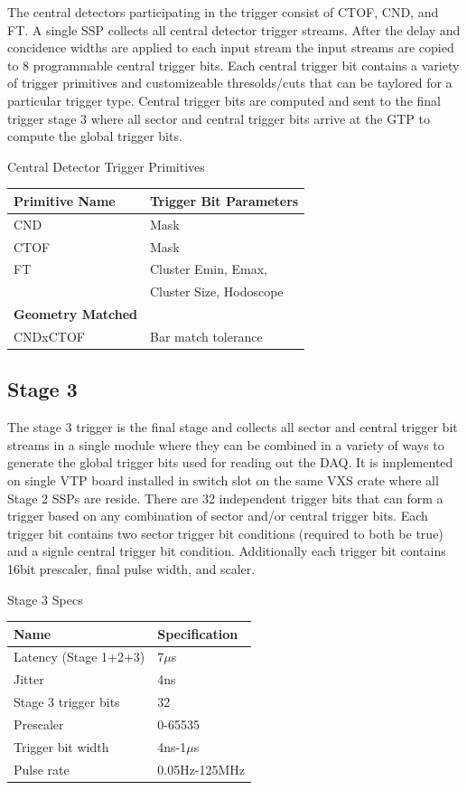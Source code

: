 The central detectors participating in the trigger consist of CTOF, CND, and FT. A single SSP collects all central detector trigger streams. After the delay and concidence widths are applied to each input stream the input streams are copied to 8 programmable central trigger bits. Each central trigger bit contains a variety of trigger primitives and customizeable thresolds/cuts that can be taylored for a particular trigger type. Central trigger bits are computed and sent to the final trigger stage 3 where all sector and central trigger bits arrive at the GTP to compute the global trigger bits.

\begin{center}
	Central Detector Trigger Primitives\\
	\begin{tabular}{| l | l |}
		\hline \hline
		Primitive Name			& Trigger Bit Parameters	\\
		\hline
		CND     			& Mask				\\
		CTOF    			& Mask				\\
		FT				& Cluster Emin, Emax, 		\\
						& Cluster Size, Hodoscope	\\
		{\bf Geometry Matched}		&				\\
		CNDxCTOF			& Bar match tolerance		\\
		\hline \hline
	\end{tabular}
\end{center}


\subsection{Stage 3}

The stage 3 trigger is the final stage and collects all sector and central trigger bit streams in a single module where they can be combined in a variety of ways to generate the global trigger bits used for reading out the DAQ. It is implemented on single VTP board installed in switch slot on the same VXS crate where all Stage 2 SSPs are reside. There are 32 independent trigger bits that can form a trigger based on any combination of sector and/or central trigger bits. Each trigger bit contains two sector trigger bit conditions (required to both be true) and a signle central trigger bit condition. Additionally each trigger bit contains 16bit prescaler, final pulse width, and scaler.

\begin{center}
	Stage 3 Specs\\
	\begin{tabular}{| l | l |}
		\hline \hline
		Name				& Specification	\\
		\hline
		Latency (Stage 1+2+3)		& 7$\mu$s	\\
		Jitter				& 4ns		\\
		Stage 3 trigger bits		& 32		\\
		Prescaler			& 0-65535	\\
		Trigger bit width		& 4ns-1$\mu$s	\\
		Pulse rate			& 0.05Hz-125MHz	\\
		\hline \hline
	\end{tabular}
\end{center}


